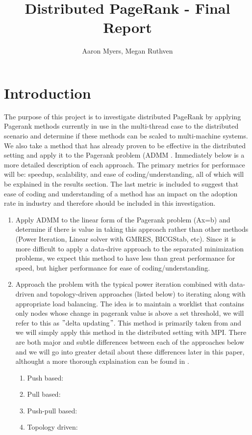 \documentclass[a4paper,10pt]{article}
\title{Distributed PageRank - Final Report}
\author{Aaron Myers, Megan Ruthven}
\begin{document}
\maketitle
\tableofcontents
\pagebreak
\section{Introduction}
The purpose of this project is to investigate distributed PageRank by applying Pagerank methods currently in use in the multi-thread case to the distributed scenario and determine if these methods can be scaled to multi-machine systems. We also take a method that has already proven to be effective in the distributed setting and apply it to the Pagerank problem (ADMM \cite{ADMM}. Immediately below is a more detailed description of each approach. The primary metrics for performace will be: speedup, scalability, and ease of coding/understanding, all of which will be explained in the results section. The last metric is included to suggest that ease of coding and understanding of a method has an impact on the adoption rate in industry and therefore should be included in this investigation.
\begin{enumerate}
\item Apply ADMM \cite{ADMM} to the linear form of the Pagerank problem (Ax=b) and determine if there is value in taking this approach rather than other methods (Power Iteration, Linear solver with GMRES, BICGStab, etc). Since it is more difficult to apply a data-drive approach to the separated minimization problems, we expect this method to have less than great performance for speed, but higher performance for ease of coding/understanding.

\item Approach the problem with the typical power iteration combined with data-driven and topology-driven approaches (listed below) to iterating along with appropriate load balancing. The idea is to maintain a worklist that contains only nodes whose change in pagerank value is above a set threshold, we will refer to this as $"$delta updating$"$. This method is primarily taken from \cite{Joyce} and we will simply apply this method in the distributed setting with MPI. There are both major and subtle differences between each of the approaches below and we will go into greater detail about these differences later in this paper, althought a more thorough explaination can be found in \cite{Joyce}.
  \begin{enumerate}
	\item Push based: 
	 \item Pull based:
	 \item Push-pull based:
	 \item Topology driven:
  \end{enumerate}
\end{enumerate}
\end{document}
